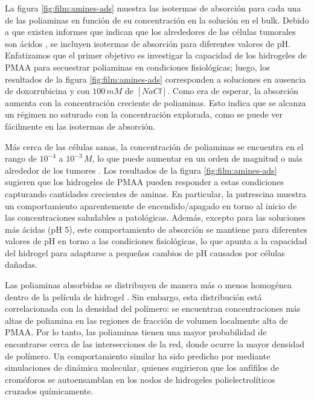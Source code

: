 La figura  \ref{fig:film:amines-ads} muestra las isotermas de absorci\'on para cada una de las poliaminas en funci\'on de su concentraci\'on en la soluci\'on en el bulk. Debido a que existen informes que indican que los alrededores de las c\'elulas tumorales son \'acidos \cite{vaupel1989blood,Tannock1989,Raghunand1999, rofstad2006acidic, schmaljohann2006thermo, Koltai2016}, se incluyen isotermas de absorci\'on para diferentes valores de pH. Enfatizamos que el primer objetivo es investigar la capacidad de los hidrogeles de PMAA para secuestrar poliaminas en condiciones fisiol\'ogicas; luego, los resultados de la figura \ref{fig:film:amines-ads} corresponden a soluciones en ausencia de doxorrubicina y con $100 \, mM$ de $[NaCl]$. Como era de esperar, la absorci\'on aumenta con la concentraci\'on creciente de poliaminas. Esto indica que se alcanza un r\'egimen no saturado con la concentraci\'on explorada, como se puede ver f\'acilmente en las isotermas de absorci\'on.

M\'as cerca de las c\'elulas sanas, la concentraci\'on de poliaminas se encuentra en el rango de $10^{-4}$ a $10^{-3}\, M$, lo que puede aumentar en un orden de magnitud o m\'as alrededor de los tumores \cite{Soda2011}. Los resultados de la figura \ref{fig:film:amines-ads} sugieren que los hidrogeles de PMAA pueden responder a estas condiciones capturando cantidades crecientes de aminas. En particular, la putrescina muestra un comportamiento aparentemente de encendido/apagado en torno al inicio de las concentraciones saludables a patol\'ogicas. Adem\'as, excepto para las soluciones m\'as ácidas (pH 5), este comportamiento de absorci\'on se mantiene para diferentes valores de pH en torno a las condiciones fisiol\'ogicas, lo que apunta a la capacidad del hidrogel para adaptarse a peque\~nos cambios de pH causados por c\'elulas da\~nadas.

Las poliaminas absorbidas se distribuyen de manera m\'as o menos homog\'enea dentro de la pel\'icula de hidrogel . Sin embargo, esta distribuci\'on est\'a correlacionada con la densidad del pol\'imero: se encuentran concentraciones m\'as altas de poliamina en las regiones de fracci\'on de volumen localmente alta de PMAA. Por lo tanto, las poliaminas tienen una mayor probabilidad de encontrarse cerca de las intersecciones de la red, donde ocurre la mayor densidad de pol\'imero. Un comportamiento similar ha sido predicho por  \cite{Sai2020} mediante simulaciones de din\'amica molecular, quienes sugirieron que los anf\'ifilos de crom\'oforos se autoensamblan en los nodos de hidrogeles polielectrol\'iticos cruzados qu\'imicamente.


